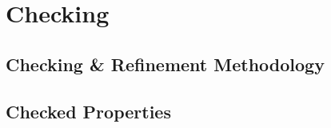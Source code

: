 \section{Checking}

\subsection{Checking \& Refinement Methodology}

\subsection{Checked Properties}
